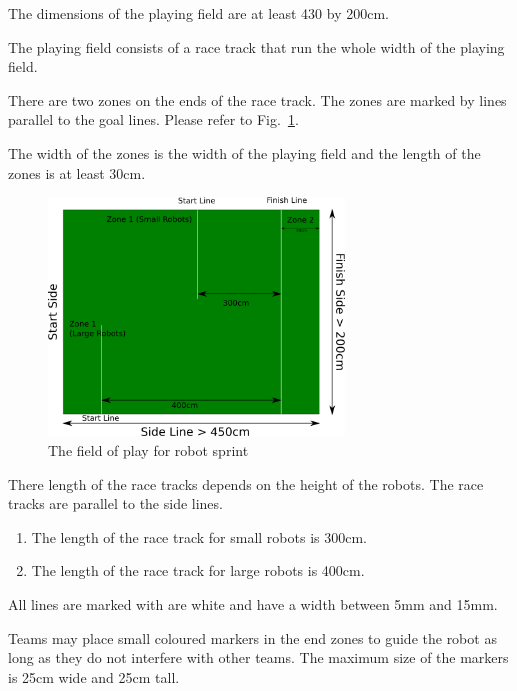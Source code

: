 \documentclass[12pt]{hurocup}
\begin{document}
\begin{lawlist}[RD]

\item The dimensions of the playing field are at least 430 by
  200cm. 
  
\item The playing field consists of a race track that run the whole
  width of the playing field.

\item There are two zones on the ends of the race track. The zones are
  marked by lines parallel to the goal lines. Please refer to
  Fig.~\ref{fig:sprint}.

\item The width of the zones is the width of the playing field and the
  length of the zones is at least 30cm.
  \begin{figure}
    \begin{center}
      \includegraphics[width=0.7\textwidth]{Figures/sprint}
    \end{center}
    \caption{The field of play for robot sprint}
    \label{fig:sprint}
  \end{figure}
  
\item There length of the race tracks depends on the height of the
  robots. The race tracks are parallel to the side lines.
  \begin{enumerate}
  \item The length of the race track for small robots
    is 300cm.
  \item The length of the race track for large robots
    is 400cm.
  \end{enumerate}

\item All lines are marked with are white and have a width between 5mm
  and 15mm.
  
\item Teams may place small coloured markers in the end zones to guide
  the robot as long as they do not interfere with other teams. The
  maximum size of the markers is 25cm wide and 25cm tall.
\end{lawlist}
\end{document}
